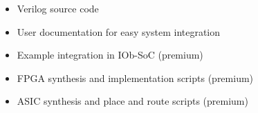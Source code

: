 \begin{itemize}
\item Verilog source code
\item User documentation for easy system integration
\item Example integration in IOb-SoC (premium)
\item FPGA synthesis and implementation scripts (premium)
\item ASIC synthesis and place and route scripts (premium)
\end{itemize}

